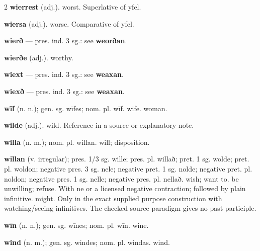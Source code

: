 \begin{multicols*}{2}
\textbf{wierrest} (adj.). worst. Superlative of yfel.\par
\textbf{wiersa} (adj.). worse. Comparative of yfel.\par
\textbf{wierð} — pres. ind. 3 sg.: see \textbf{weorðan}.\par
\textbf{wierðe} (adj.). worthy.\par
\textbf{wiext} — pres. ind. 3 sg.: see \textbf{weaxan}.\par
\textbf{wiexð} — pres. ind. 3 sg.: see \textbf{weaxan}.\par
\textbf{wīf} (n. n.); gen. sg. wīfes; nom. pl. wīf. wife. woman.\par
\textbf{wilde} (adj.). wild. Reference in a source or explanatory note.\par
\textbf{willa} (n. m.); nom. pl. willan. will; disposition.\par
\textbf{willan} (v. irregular); pres. 1/3 sg. wille; pres. pl. willað; pret. 1 sg. wolde; pret. pl. woldon; negative pres. 3 sg. nele; negative pret. 1 sg. nolde; negative pret. pl. noldon; negative pres. 1 sg. nelle; negative pres. pl. nellað. wish; want to. be unwilling; refuse. With ne or a licensed negative contraction; followed by plain infinitive. might. Only in the exact supplied purpose construction with watching/seeing infinitives. The checked source paradigm gives no past participle.\par
\textbf{wīn} (n. n.); gen. sg. wīnes; nom. pl. wīn. wine.\par
\textbf{wind} (n. m.); gen. sg. windes; nom. pl. windas. wind.\par

\end{multicols*}
